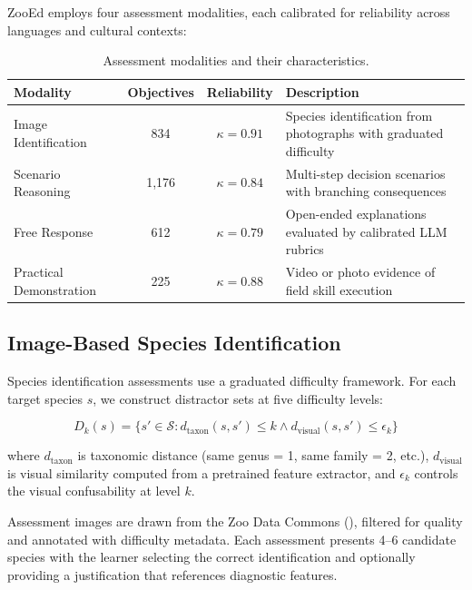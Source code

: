 \documentclass[11pt,a4paper]{article}
\begin{document}
ZooEd employs four assessment modalities, each calibrated for reliability across languages and cultural contexts:

\begin{table}[H]
\centering
\caption{Assessment modalities and their characteristics.}
\label{tab:assessment_modalities}
\begin{tabularx}{\textwidth}{@{}lccX@{}}
\toprule
\textbf{Modality} & \textbf{Objectives} & \textbf{Reliability} & \textbf{Description} \\
\midrule
Image Identification & 834 & $\kappa = 0.91$ & Species identification from photographs with graduated difficulty \\
Scenario Reasoning & 1,176 & $\kappa = 0.84$ & Multi-step decision scenarios with branching consequences \\
Free Response & 612 & $\kappa = 0.79$ & Open-ended explanations evaluated by calibrated LLM rubrics \\
Practical Demonstration & 225 & $\kappa = 0.88$ & Video or photo evidence of field skill execution \\
\bottomrule
\end{tabularx}
\end{table}

\subsection{Image-Based Species Identification}

Species identification assessments use a graduated difficulty framework.
For each target species $s$, we construct distractor sets at five difficulty levels:

\begin{equation}
    D_k(s) = \{s' \in \mathcal{S} : d_{\text{taxon}}(s, s') \leq k \wedge d_{\text{visual}}(s, s') \leq \epsilon_k\}
\end{equation}

\noindent where $d_{\text{taxon}}$ is taxonomic distance (same genus = 1, same family = 2, etc.), $d_{\text{visual}}$ is visual similarity computed from a pretrained feature extractor, and $\epsilon_k$ controls the visual confusability at level $k$.

Assessment images are drawn from the Zoo Data Commons (), filtered for quality and annotated with difficulty metadata.
Each assessment presents 4--6 candidate species with the learner selecting the correct identification and optionally providing a justification that references diagnostic features.
\end{document}
